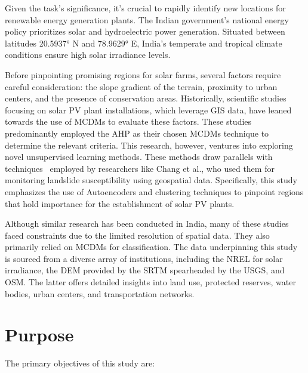 \documentclass[a4paper,12pt]{Classes/RoboticsLaTeX}
\begin{document}
	Given the task's significance, it's crucial to rapidly identify new locations for renewable energy generation plants. The Indian government's national energy policy 
	prioritizes solar and hydroelectric power generation. Situated between latitudes 20.5937° N and 78.9629° E, India's temperate and tropical climate conditions ensure 
	high solar irradiance levels.

	Before pinpointing promising regions for solar farms, several factors require careful consideration: the slope gradient of the terrain, proximity to urban centers, and the 
	presence of conservation areas. Historically, scientific studies focusing on solar \ac{PV} plant installations, which leverage GIS data, have leaned towards the use of 
	\ac{MCDMs} to evaluate these factors\cite{reuters2022,colak2020,garni2017,zoghi2017,saraswat2021}. These studies predominantly employed the \ac{AHP} as their chosen \ac{MCDMs} 
	technique to determine the relevant criteria. This research, however, ventures into exploring novel unsupervised learning methods. These methods draw parallels with techniques \
	employed by researchers like Chang et al., who used them for monitoring landslide susceptibility using geospatial data\cite{chang2020}. Specifically, this study emphasizes the 
	use of Autoencoders and clustering techniques to pinpoint regions that hold importance for the establishment of solar \ac{PV} plants.

	Although similar research has been conducted in India, many of these studies faced constraints due to the limited resolution of spatial 
	data\cite{jain2011,saraswat2021,sindhu2017}. They also primarily relied on \ac{MCDMs} for classification. The data underpinning this study is sourced from a diverse array of 
	institutions, including the \ac{NREL} for solar irradiance, the \ac{DEM} provided by the \ac{SRTM} spearheaded by the \ac{USGS}, and \ac{OSM}. The latter offers detailed insights into land use, protected reserves, water bodies, 
	urban centers, and transportation networks.

	
	\section{Purpose}

	The primary objectives of this study are:
\end{document}
